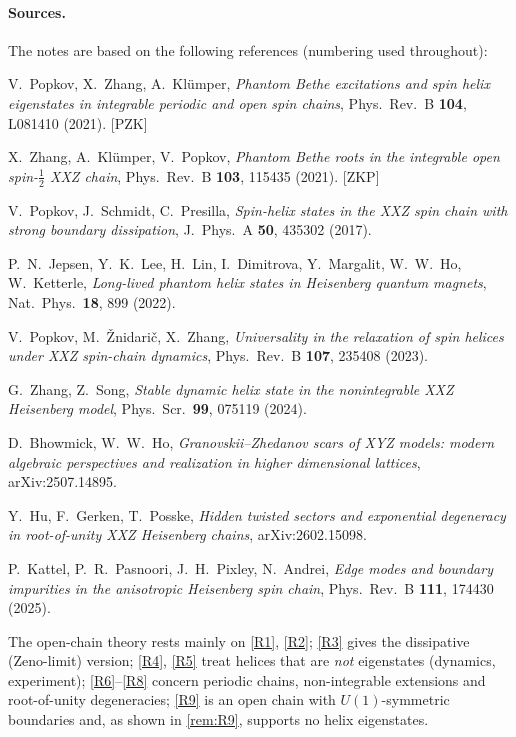 \documentclass[11pt,a4paper]{article}
\theoremstyle{definition}
\begin{document}
\paragraph{Sources.} The notes are based on the following references (numbering used throughout):
\begin{enumerate}[label={[R\arabic*]},leftmargin=3.2em]
\item\label{R1} V.~Popkov, X.~Zhang, A.~Kl\"umper, \emph{Phantom Bethe excitations and spin helix eigenstates in integrable periodic and open spin chains}, Phys.\ Rev.\ B \textbf{104}, L081410 (2021). [PZK]
\item\label{R2} X.~Zhang, A.~Kl\"umper, V.~Popkov, \emph{Phantom Bethe roots in the integrable open spin-$\frac12$ XXZ chain}, Phys.\ Rev.\ B \textbf{103}, 115435 (2021). [ZKP]
\item\label{R3} V.~Popkov, J.~Schmidt, C.~Presilla, \emph{Spin-helix states in the XXZ spin chain with strong boundary dissipation}, J.\ Phys.\ A \textbf{50}, 435302 (2017).
\item\label{R4} P.~N.~Jepsen, Y.~K.~Lee, H.~Lin, I.~Dimitrova, Y.~Margalit, W.~W.~Ho, W.~Ketterle, \emph{Long-lived phantom helix states in Heisenberg quantum magnets}, Nat.\ Phys.\ \textbf{18}, 899 (2022).
\item\label{R5} V.~Popkov, M.~\v{Z}nidari\v{c}, X.~Zhang, \emph{Universality in the relaxation of spin helices under XXZ spin-chain dynamics}, Phys.\ Rev.\ B \textbf{107}, 235408 (2023).
\item\label{R6} G.~Zhang, Z.~Song, \emph{Stable dynamic helix state in the nonintegrable XXZ Heisenberg model}, Phys.\ Scr.\ \textbf{99}, 075119 (2024).
\item\label{R7} D.~Bhowmick, W.~W.~Ho, \emph{Granovskii--Zhedanov scars of XYZ models: modern algebraic perspectives and realization in higher dimensional lattices}, arXiv:2507.14895.
\item\label{R8} Y.~Hu, F.~Gerken, T.~Posske, \emph{Hidden twisted sectors and exponential degeneracy in root-of-unity XXZ Heisenberg chains}, arXiv:2602.15098.
\item\label{R9} P.~Kattel, P.~R.~Pasnoori, J.~H.~Pixley, N.~Andrei, \emph{Edge modes and boundary impurities in the anisotropic Heisenberg spin chain}, Phys.\ Rev.\ B \textbf{111}, 174430 (2025).
\end{enumerate}
The open-chain theory rests mainly on \ref{R1}, \ref{R2}; \ref{R3} gives the dissipative (Zeno-limit) version; \ref{R4}, \ref{R5} treat helices that are \emph{not} eigenstates (dynamics, experiment); \ref{R6}--\ref{R8} concern periodic chains, non-integrable extensions and root-of-unity degeneracies; \ref{R9} is an open chain with $U(1)$-symmetric boundaries and, as shown in \cref{rem:R9}, supports no helix eigenstates.
\end{document}
